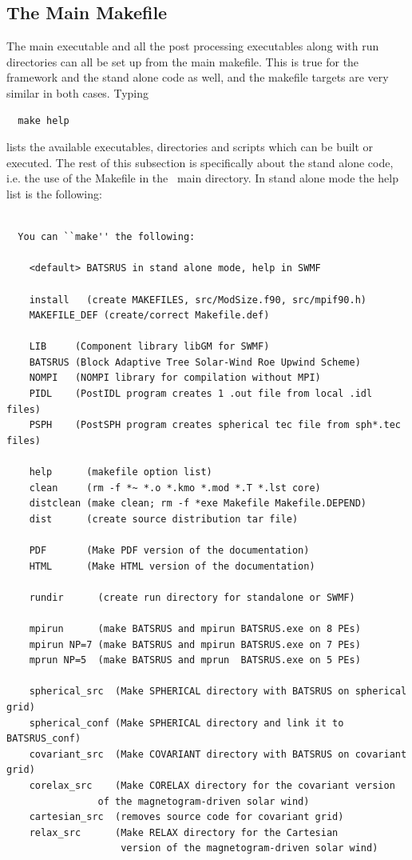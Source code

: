 \subsection{The Main Makefile \label{section:main_make}}

The main executable and all the post processing executables along
with run directories can all be set up from the main makefile.
This is true for the framework and the stand alone code as well,
and the makefile targets are very similar in both cases.
Typing
\begin{verbatim}
  make help
\end{verbatim}
lists the available executables, directories and scripts which can be built 
or executed. The rest of this subsection is specifically about the stand 
alone code, i.e. the use of the Makefile in the \BATSRUS\ main directory.
In stand alone mode the help list is the following: 
\begin{verbatim}

  You can ``make'' the following:
  
    <default> BATSRUS in stand alone mode, help in SWMF
  
    install   (create MAKEFILES, src/ModSize.f90, src/mpif90.h)
    MAKEFILE_DEF (create/correct Makefile.def)
  
    LIB     (Component library libGM for SWMF)
    BATSRUS (Block Adaptive Tree Solar-Wind Roe Upwind Scheme)
    NOMPI   (NOMPI library for compilation without MPI)
    PIDL    (PostIDL program creates 1 .out file from local .idl files)
    PSPH    (PostSPH program creates spherical tec file from sph*.tec files)
  
    help      (makefile option list)
    clean     (rm -f *~ *.o *.kmo *.mod *.T *.lst core)
    distclean (make clean; rm -f *exe Makefile Makefile.DEPEND)
    dist      (create source distribution tar file)
  
    PDF       (Make PDF version of the documentation)
    HTML      (Make HTML version of the documentation)
  
    rundir      (create run directory for standalone or SWMF)
  
    mpirun      (make BATSRUS and mpirun BATSRUS.exe on 8 PEs)
    mpirun NP=7 (make BATSRUS and mpirun BATSRUS.exe on 7 PEs)
    mprun NP=5  (make BATSRUS and mprun  BATSRUS.exe on 5 PEs)
  
    spherical_src  (Make SPHERICAL directory with BATSRUS on spherical grid)
    spherical_conf (Make SPHERICAL directory and link it to BATSRUS_conf)
    covariant_src  (Make COVARIANT directory with BATSRUS on covariant grid)
    corelax_src    (Make CORELAX directory for the covariant version
                of the magnetogram-driven solar wind)
    cartesian_src  (removes source code for covariant grid)
    relax_src      (Make RELAX directory for the Cartesian
                    version of the magnetogram-driven solar wind)

\end{verbatim}

